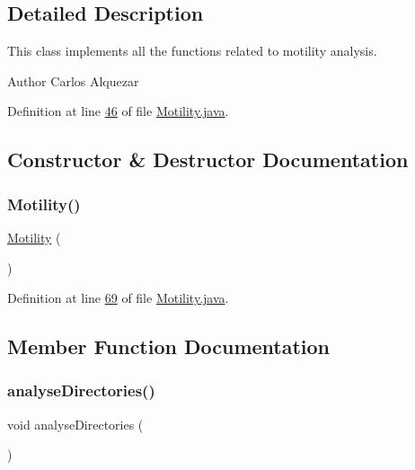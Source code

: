 \subsection{Detailed Description}
This class implements all the functions related to motility analysis.

\begin{DoxyAuthor}{Author}
Carlos Alquezar 
\end{DoxyAuthor}


Definition at line \hyperlink{_motility_8java_source_l00046}{46} of file \hyperlink{_motility_8java_source}{Motility.\+java}.



\subsection{Constructor \& Destructor Documentation}
\hypertarget{classanalysis_1_1_motility_a7c749f31bb24070f3cb6e9133160eb34}{}\label{classanalysis_1_1_motility_a7c749f31bb24070f3cb6e9133160eb34} 
\subsubsection{\texorpdfstring{Motility()}{Motility()}}
{\footnotesize\ttfamily \hyperlink{classanalysis_1_1_motility}{Motility} (\begin{DoxyParamCaption}{ }\end{DoxyParamCaption})}



Definition at line \hyperlink{_motility_8java_source_l00069}{69} of file \hyperlink{_motility_8java_source}{Motility.\+java}.



\subsection{Member Function Documentation}
\hypertarget{classanalysis_1_1_motility_ab3d086d15d667db78ea6785d8fc90223}{}\label{classanalysis_1_1_motility_ab3d086d15d667db78ea6785d8fc90223} 
\subsubsection{\texorpdfstring{analyse\+Directories()}{analyseDirectories()}}
{\footnotesize\ttfamily void analyse\+Directories (\begin{DoxyParamCaption}{ }\end{DoxyParamCaption})\hspace{0.3cm}{\ttfamily [private]}}


